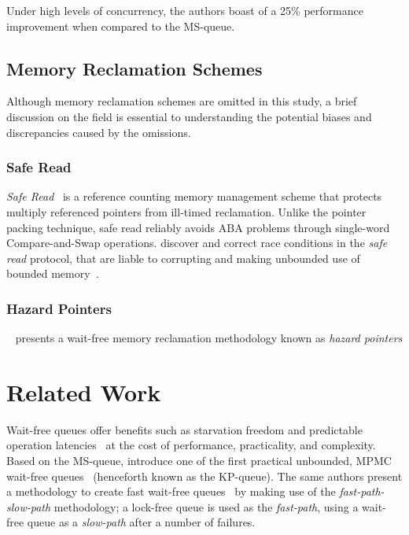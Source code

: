 Under high levels of concurrency, the authors boast of a 25\% performance
improvement when compared to the MS-queue.

\subsection{Memory Reclamation Schemes}
Although memory reclamation schemes are omitted in this study, a brief discussion
on the field is essential to understanding the potential biases and discrepancies caused
by the omissions.

\subsubsection{Safe Read}
\emph{Safe Read}~\citep{valois1994queues,valois1995datastructures} 
is a reference counting memory management scheme that protects multiply referenced
pointers from ill-timed reclamation. 
Unlike the pointer packing technique, safe read reliably avoids ABA problems through
single-word Compare-and-Swap operations. \citeauthor{michael1995correction} discover
and correct race conditions in the \emph{safe read} protocol, that are liable to
corrupting and making unbounded use of bounded memory~\citep{michael1995correction}.

\subsubsection{Hazard Pointers}
\citeauthor{michael2004hazard}~\citep{michael2004hazard} presents a wait-free
memory reclamation methodology known as \emph{hazard pointers}

\section{Related Work}
Wait-free queues offer benefits such as starvation freedom and predictable
operation latencies \textemdash~at the cost of performance, practicality, and complexity.
Based on the MS-queue, \citeauthor{kogan2011wait} introduce one of the first practical unbounded, MPMC
wait-free queues~\citep{kogan2011wait} (henceforth known as the KP-queue). The
same authors present a methodology to create fast wait-free queues~\citep{kogan2012methodology} by
making use of the \emph{fast-path-slow-path} methodology; a lock-free queue is
used as the \emph{fast-path}, using a wait-free queue as a \emph{slow-path} after a number of failures.